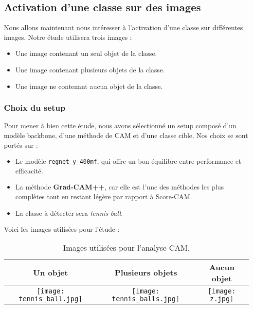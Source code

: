 \documentclass{article}
\begin{document}
\subsection{Activation d'une classe sur des images}

Nous allons maintenant nous intéresser à l'activation d'une classe sur différentes images. Notre étude utilisera trois images : 
\begin{itemize}
    \item Une image contenant un seul objet de la classe.
    \item Une image contenant plusieurs objets de la classe.
    \item Une image ne contenant aucun objet de la classe.
\end{itemize}

\subsubsection{Choix du setup}

Pour mener à bien cette étude, nous avons sélectionné un setup composé d'un modèle backbone, d'une méthode de CAM et d'une classe cible. Nos choix se sont portés sur : 
\begin{itemize}
    \item Le modèle \texttt{regnet\_y\_400mf}, qui offre un bon équilibre entre performance et efficacité.
    \item La méthode \textbf{Grad-CAM++}, car elle est l'une des méthodes les plus complètes tout en restant légère par rapport à Score-CAM.
    \item La classe à détecter sera \textit{tennis ball}.
\end{itemize}

\newpage

Voici les images utilisées pour l'étude :

\begin{table}[H]
    \centering
    \begin{tabular}{|c|c|c|}
      \hline
      \textbf{Un objet} & \textbf{Plusieurs objets} & \textbf{Aucun objet} \\
      \hline
      \texttt{[image: tennis\_ball.jpg]} &
      \texttt{[image: tennis\_balls.jpg]} &
      \texttt{[image: z.jpg]} \\
      \hline
    \end{tabular}
    \caption{Images utilisées pour l'analyse CAM.}
    \label{tab:images_cam}
\end{table}
\end{document}
